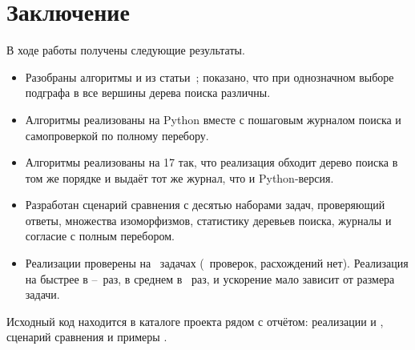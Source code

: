 
\section*{Заключение}

В ходе работы получены следующие результаты.
\begin{itemize}
    \item Разобраны алгоритмы \ISOMone{} и \ISOMn{} из статьи~\cite{KosovskayaIsom}; показано, что при однозначном выборе подграфа в  все вершины дерева поиска различны.
    \item Алгоритмы реализованы на Python вместе с пошаговым журналом поиска и самопроверкой по полному перебору.
    \item Алгоритмы реализованы на \Cpp{}17 так, что реализация обходит дерево поиска в том же порядке и выдаёт тот же журнал, что и Python-версия.
    \item Разработан сценарий сравнения с десятью наборами задач, проверяющий ответы, множества изоморфизмов, статистику деревьев поиска, журналы и согласие с полным перебором.
    \item Реализации проверены на \NCases{}~задачах (\NChecks{}~проверок, расхождений нет).
          Реализация на \Cpp{} быстрее в \SpeedupMin--\SpeedupMax{}~раз, в среднем в \SpeedupGeo{}~раз, и ускорение мало зависит от размера задачи.
\end{itemize}

{\raggedright Исходный код находится в каталоге проекта рядом с отчётом: реализации  и , сценарий сравнения  и примеры . %
\par}
